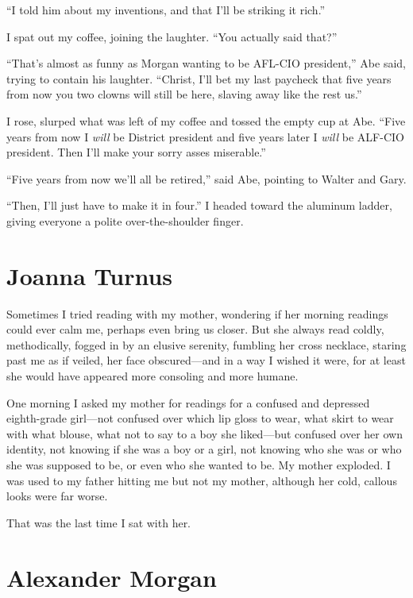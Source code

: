 ``I told him about my inventions, and that I'll be striking it rich.''

I spat out my coffee, joining the laughter. ``You actually said that?''

``That's almost as funny as Morgan wanting to be AFL-CIO president,''
Abe said, trying to contain his laughter. ``Christ, I'll bet my last
paycheck that five years from now you two clowns will still be here,
slaving away like the rest us.''

I rose, slurped what was left of my coffee and tossed the empty cup at
Abe. ``Five years from now I \emph{will} be District president and five
years later I \emph{will} be ALF-CIO president. Then I'll make your
sorry asses miserable.''

``Five years from now we'll all be retired,'' said Abe, pointing to
Walter and Gary.

``Then, I'll just have to make it in four.'' I headed toward the
aluminum ladder, giving everyone a polite over-the-shoulder finger.

\chapter{Joanna Turnus}

\titlemark

Sometimes I tried reading with my mother, wondering if her morning
readings could ever calm me, perhaps even bring us closer. But she
always read coldly, methodically, fogged in by an elusive serenity,
fumbling her cross necklace, staring past me as if veiled, her face
obscured---and in a way I wished it were, for at least she would have
appeared more consoling and more humane.

One morning I asked my mother for readings for a confused and depressed
eighth-grade girl---not confused over which lip gloss to wear, what
skirt to wear with what blouse, what not to say to a boy she liked---but
confused over her own identity, not knowing if she was a boy or a girl,
not knowing who she was or who she was supposed to be, or even who she
wanted to be. My mother exploded. I was used to my father hitting me but
not my mother, although her cold, callous looks were far worse.

That was the last time I sat with her.

\chapter{Alexander Morgan}

